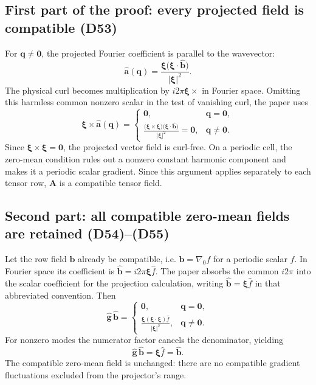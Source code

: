 \documentclass[11pt,a4paper]{article}
\numberwithin{equation}{section}
\newcommand{\zero}{\mathbf0}
\newcommand{\Dtag}[1]{\tag{D#1}}
\begin{document}
\subsection{First part of the proof: every projected field is compatible (D53)}
For $\mathbf q\neq\zero$, the projected Fourier coefficient is parallel to the wavevector:
\[
\hat{\mathbf a}(\mathbf q)=\frac{\bm\xi\big(\bm\xi\cdot\hat{\mathbf b}\big)}{|\bm\xi|^2}.
\]
The physical curl becomes multiplication by $i2\pi\bm\xi\times$ in Fourier space. Omitting this harmless common nonzero scalar in the test of vanishing curl, the paper uses
\begin{equation}
\bm\xi\times\hat{\mathbf a}(\mathbf q)
=\begin{cases}
\zero,&\mathbf q=\zero,\\[3pt]
\displaystyle\frac{\big(\bm\xi\times\bm\xi\big)
\big(\bm\xi\cdot\hat{\mathbf b}\big)}{|\bm\xi|^2}=\zero,&\mathbf q\ne\zero.
\end{cases}
\Dtag{53}\label{pd53}\end{equation}
Since $\bm\xi\times\bm\xi=\zero$, the projected vector field is curl-free. On a periodic cell, the zero-mean condition rules out a nonzero constant harmonic component and makes it a periodic scalar gradient. Since this argument applies separately to each tensor row, $\mathbf A$ is a compatible tensor field.

\subsection{Second part: all compatible zero-mean fields are retained (D54)--(D55)}
Let the row field $\mathbf b$ already be compatible, i.e. $\mathbf b=\nabla_0 f$ for a periodic scalar $f$. In Fourier space its coefficient is $\hat{\mathbf b}=i2\pi\bm\xi\hat f$. The paper absorbs the common $i2\pi$ into the scalar coefficient for the projection calculation, writing $\hat{\mathbf b}=\bm\xi\hat f$ in that abbreviated convention. Then
\begin{equation}
\hat{\mathbf g}\,\hat{\mathbf b}=
\begin{cases}
\zero,&\mathbf q=\zero,\\[3pt]
\displaystyle\frac{\bm\xi(\bm\xi\cdot\bm\xi)\hat f}{|\bm\xi|^2},&\mathbf q\ne\zero.
\end{cases}
\Dtag{54}\label{pd54}\end{equation}
For nonzero modes the numerator factor cancels the denominator, yielding
\begin{equation}
\boxed{\hat{\mathbf g}\,\hat{\mathbf b}=\bm\xi\hat f=\hat{\mathbf b}.}
\Dtag{55}\label{pd55}\end{equation}
The compatible zero-mean field is unchanged: there are no compatible gradient fluctuations excluded from the projector's range.
\end{document}
